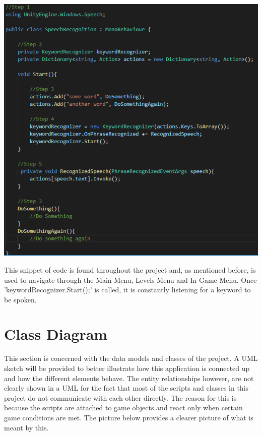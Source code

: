 \documentclass{article}
\begin{document}
\bigskip

\includegraphics[width=\textwidth, height=\textwidth]{img/speechCode.PNG}

\bigskip

This snippet of code is found throughout the project and, as mentioned before, is used to navigate through the Main Menu, Levels Menu and In-Game Menu. Once 'keywordRecognizer.Start();' is called, it is constantly listening for a keyword to be spoken.

\section{Class Diagram}
This section is concerned with the data models and classes of the project. A UML sketch will be provided to better illustrate how this application is connected up and how the different elements behave. The entity relationships however, are not clearly shown in a UML for the fact that most of the scripts and classes in this project do not communicate with each other directly. The reason for this is because the scripts are attached to game objects and react only when certain game conditions are met.  The picture below provides a clearer picture of what is meant by this.

\bigskip
\end{document}
